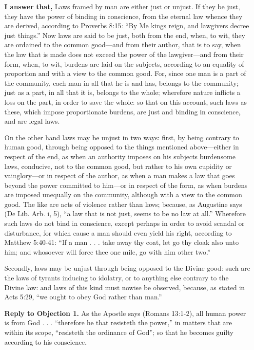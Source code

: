 \textbf{I answer that,} Laws framed by man are either just or unjust. If they be just, they have the power of binding in conscience, from the eternal law whence they are derived, according to Proverbs 8:15: ``By Me kings reign, and lawgivers decree just things.'' Now laws are said to be just, both from the end, when, to wit, they are ordained to the common good—and from their author, that is to say, when the law that is made does not exceed the power of the lawgiver—and from their form, when, to wit, burdens are laid on the subjects, according to an equality of proportion and with a view to the common good. For, since one man is a part of the community, each man in all that he is and has, belongs to the community; just as a part, in all that it is, belongs to the whole; wherefore nature inflicts a loss on the part, in order to save the whole: so that on this account, such laws as these, which impose proportionate burdens, are just and binding in conscience, and are legal laws.

On the other hand laws may be unjust in two ways: first, by being contrary to human good, through being opposed to the things mentioned above—either in respect of the end, as when an authority imposes on his subjects burdensome laws, conducive, not to the common good, but rather to his own cupidity or vainglory—or in respect of the author, as when a man makes a law that goes beyond the power committed to him—or in respect of the form, as when burdens are imposed unequally on the community, although with a view to the common good. The like are acts of violence rather than laws; because, as Augustine says (De Lib. Arb. i, 5), ``a law that is not just, seems to be no law at all.'' Wherefore such laws do not bind in conscience, except perhaps in order to avoid scandal or disturbance, for which cause a man should even yield his right, according to Matthew 5:40-41: ``If a man . . . take away thy coat, let go thy cloak also unto him; and whosoever will force thee one mile, go with him other two.''

Secondly, laws may be unjust through being opposed to the Divine good: such are the laws of tyrants inducing to idolatry, or to anything else contrary to the Divine law: and laws of this kind must nowise be observed, because, as stated in Acts 5:29, ``we ought to obey God rather than man.''

\textbf{Reply to Objection 1.} As the Apostle says (Romans 13:1-2), all human power is from God . . . ``therefore he that resisteth the power,'' in matters that are within its scope, ``resisteth the ordinance of God''; so that he becomes guilty according to his conscience.

